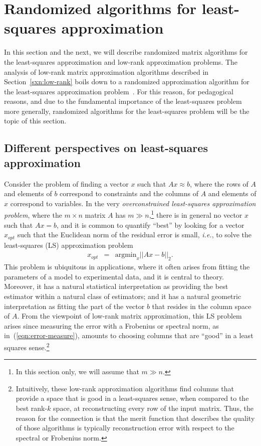 \documentclass[twoside]{article}
\begin{document}
 \section{Randomized algorithms for least-squares approximation}
\label{sxn:least-squares}

In this section and the next, we will describe randomized matrix algorithms
for the least-squares approximation and low-rank approximation problems.
The analysis of low-rank matrix approximation algorithms described in 
Section~\ref{sxn:low-rank} boils down to a randomized approximation 
algorithm for the least-squares approximation 
problem~\cite{DMM08_CURtheory_JRNL,CUR_PNAS,BMD09_CSSP_SODA,BMD08_CSSP_TRv2}.
For this reason, for pedagogical reasons, and due to the fundamental 
importance of the least-squares problem more generally, randomized algorithms for the least-squares 
problem will be the topic of this section.



\subsection{Different perspectives on least-squares approximation}
\label{sxn:least-squares:perspectives}

Consider the problem of finding a vector $x$ such that $Ax \approx b$, 
where the rows of $A$ and elements of $b$ correspond to constraints and the 
columns of $A$ and elements of $x$ correspond to variables.
In the very \emph{overconstrained least-squares approximation problem}, 
where the $m \times n$ matrix $A$ has $m \gg n$,\footnote{In this section only, we will assume that $m \gg n$.}
there is in general no vector $x$ such that $Ax=b$, and it is 
common to quantify ``best'' by looking for a vector $x_{opt}$ such that the 
Euclidean norm of the residual error is small, \emph{i.e.}, to solve 
the least-squares (LS) approximation problem
\begin{eqnarray}
\label{eqn:orig_ls_prob}
x_{opt} &=& \mbox{argmin}_x ||Ax-b||_2  .
\end{eqnarray}
This problem is ubiquitous in applications, where it often arises from 
fitting the parameters of a model to experimental data, and it is central 
to theory.
Moreover, it has a natural statistical interpretation as providing the best 
estimator within a natural class of estimators; and it has a natural 
geometric interpretation as fitting the part of the vector $b$ that resides 
in the column space of $A$.
From the viewpoint of low-rank matrix approximation, this LS problem arises 
since measuring the error with a Frobenius or spectral norm, as 
in~(\ref{eqn:error-measure}), amounts to choosing columns that are ``good'' 
in a least squares sense.\footnote{Intuitively, these low-rank approximation algorithms find columns 
that provide a space that is good in a least-squares sense, when compared 
to the best rank-$k$ space, at reconstructing every row of the input 
matrix.  Thus, the reason for the connection is that the merit function 
that describes the quality of those algorithms is typically reconstruction 
error with respect to the spectral or Frobenius norm.} 
\end{document}
